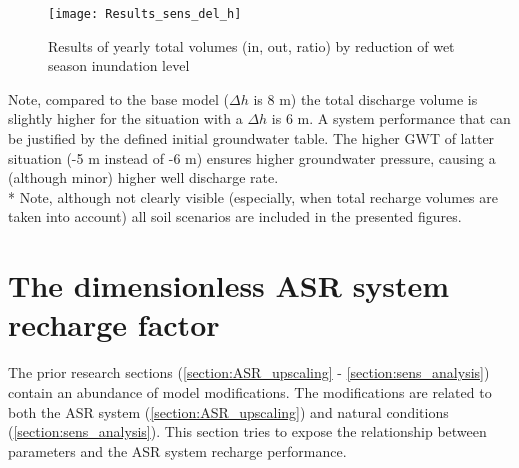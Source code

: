 \begin{figure}[H]
 \centering
 \texttt{[image: Results\_sens\_del\_h]}
 \captionsetup{justification=centering} 
 \caption{Results of yearly total volumes (in, out, ratio) by reduction of wet season inundation level}
 \label{fig:Results_sens_del_h}
\end{figure}

Note, compared to the base model ($\Delta h$ is 8 m) the total discharge volume is slightly higher for the situation with a $\Delta h$ is 6 m. A system performance that can be justified by the defined initial groundwater table. The higher GWT of latter situation (-5 m instead of -6 m) ensures higher groundwater pressure, causing a (although minor) higher well discharge rate. \\


* Note, although not clearly visible (especially, when total recharge volumes are taken into account) all soil scenarios are included in the presented figures.  \\
 
%
%
%

\section{The dimensionless ASR system recharge factor}
\label{section:dim_fac}
The prior research sections (\ref{section:ASR_upscaling} - \ref{section:sens_analysis}) contain an abundance of model modifications. The modifications are related to both the ASR system (\ref{section:ASR_upscaling}) and natural conditions (\ref{section:sens_analysis}). This section tries to expose the relationship between parameters and the ASR system recharge performance. \\

